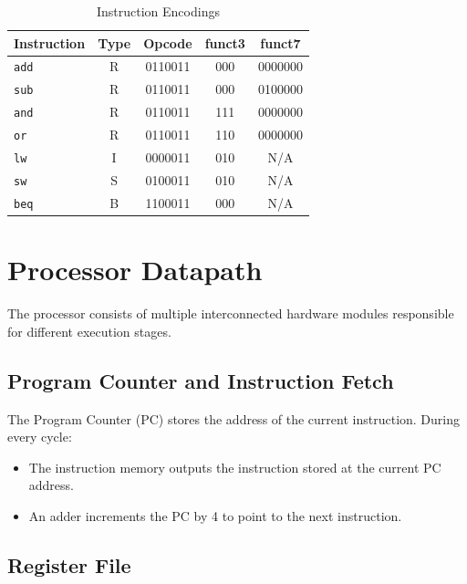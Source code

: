 \documentclass[10pt,a4paper,twocolumn]{article}
\begin{document}
\begin{table}[t]
\centering
\caption{Instruction Encodings}
\label{tab:encodings}

\begin{tabular}{|l|c|c|c|c|}
\hline
\textbf{Instruction} & \textbf{Type} & \textbf{Opcode} & \textbf{funct3} & \textbf{funct7} \\
\hline
\texttt{add} & R & 0110011 & 000 & 0000000 \\
\hline
\texttt{sub} & R & 0110011 & 000 & 0100000 \\
\hline
\texttt{and} & R & 0110011 & 111 & 0000000 \\
\hline
\texttt{or} & R & 0110011 & 110 & 0000000 \\
\hline
\texttt{lw} & I & 0000011 & 010 & N/A \\
\hline
\texttt{sw} & S & 0100011 & 010 & N/A \\
\hline
\texttt{beq} & B & 1100011 & 000 & N/A \\
\hline
\end{tabular}
\end{table}

\section{Processor Datapath}

The processor consists of multiple interconnected hardware modules responsible for different execution stages.

\subsection{Program Counter and Instruction Fetch}

The Program Counter (PC) stores the address of the current instruction. During every cycle:

\begin{itemize}
    \item The instruction memory outputs the instruction stored at the current PC address.
    \item An adder increments the PC by 4 to point to the next instruction.
\end{itemize}

\subsection{Register File}
\end{document}
